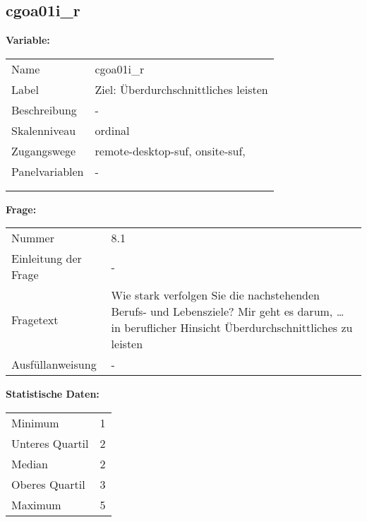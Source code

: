 	
	
	\subsection{cgoa01i\_r}
	\label{subSection:cgoa01i_r}

	\noindent\textbf{Variable:}\\
		\begin{tabular}{lL{11.3cm}}
			\label{tableVariable:cgoa01i_r}
			Name & cgoa01i\_r \\
			Label & Ziel: Überdurchschnittliches leisten \\
			Beschreibung & - \\
			Skalenniveau & ordinal \\
			Zugangswege &
				remote-desktop-suf,
				onsite-suf,
 \\
			Panelvariablen & -
			 \\
			 \\
 \\
		\end{tabular}

		\vspace*{1 cm}
		\noindent\textbf{Frage:}\\
		\begin{tabular}{lL{11.3cm}}
			\label{tableQuestion:cgoa01i_r}
			Nummer & 8.1 \\
			Einleitung der Frage & - \\
			Fragetext & Wie stark verfolgen Sie die nachstehenden Berufs- und Lebensziele?
Mir geht es darum, …
in beruflicher Hinsicht Überdurchschnittliches zu leisten \\
			Ausfüllanweisung & - \\
		\end{tabular}


		\vspace*{1 cm}
		\noindent\textbf{Statistische Daten:}\\
			\begin{tabular}{ll}
				\label{tableStatistics:cgoa01i_r}
					Minimum & 1 \\
					Unteres Quartil & 2 \\
					Median & 2 \\
					Oberes Quartil & 3 \\
					Maximum & 5 \\
			\end{tabular}



